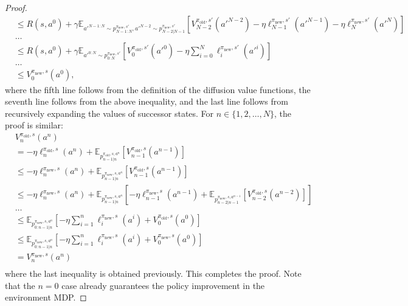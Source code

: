 \begin{proof}
$$\begin{aligned}
        &\leq R(s, a^0)+\gamma\mathbb{E}_{a'^{N-1:N}\sim p^{\pi_{\textrm{new}},s'}_{N-1:N},a'^{N-2}\sim p^{\pi_{\textrm{new}},s'}_{N-2|N-1}}\left[V^{\pi_{\textrm{old}},s'}_{N-2}(a'^{N-2})-\eta\ell_{N-1}^{\pi_{\textrm{new}},s'}(a'^{N-1})-\eta\ell_N^{\pi_{\textrm{new}},s'}(a'^{N})\right]\\
        &\ldots\\
        &\leq R(s, a^0)+\gamma\mathbb{E}_{a'^{0:N}\sim p^{\pi_{\textrm{new}},s'}_{0:N}}\left[V^{\pi_{\textrm{old}},s'}_{0}(a'^{0})-\eta\sum_{i=0}^N\ell_i^{\pi_{\textrm{new}},s'}(a'^{i})\right]\\
        &\ldots\\
        &\leq V_0^{\pi_{\textrm{new}}, s}(a^0),
    \end{aligned}
    $$
    where the fifth line follows from the definition of the diffusion value functions, the seventh line follows from the above inequality, and the last line follows from recursively expanding the values of successor states. For $n\in\{1, 2, \ldots, N\}$, the proof is similar:
    $$
    \begin{aligned}
        &V^{\pi_{\textrm{old}},s}_{n}(a^{n})\\
        &=-\eta\ell^{\pi_{\textrm{old}},s}_n(a^n) + \mathbb{E}_{p^{\pi_{\textrm{old}},s,a^n}_{n-1|n}}\left[V^{\pi_{\textrm{old}},s}_{n-1}(a^{n-1})\right]\\
        &\leq-\eta\ell^{\pi_{\textrm{new}},s}_n(a^n) + \mathbb{E}_{p^{\pi_{\textrm{new}},s,a^n}_{n-1|n}}\left[V^{\pi_{\textrm{old}},s}_{n-1}(a^{n-1})\right]\\
        &\leq-\eta\ell^{\pi_{\textrm{new}},s}_n(a^n) + \mathbb{E}_{p^{\pi_{\textrm{new}},s,a^n}_{n-1|n}}\left[-\eta\ell^{\pi_{\textrm{new}},s}_{n-1}(a^{n-1}) + \mathbb{E}_{p^{\pi_{\textrm{new}},s,a^{n-1}}_{n-2|n-1}}\left[V^{\pi_{\textrm{old}},s}_{n-2}(a^{n-2})\right]\right]\\
        &\ldots\\
        &\leq \mathbb{E}_{p^{\pi_{\textrm{new}},s,a^n}_{0:n-1|n}}\left[-\eta\sum_{i=1}^{n}\ell^{\pi_{\textrm{new}},s}_{i}(a^{i}) + V^{\pi_{\textrm{old}}, s}_0(a^0)\right]\\
        &\leq \mathbb{E}_{p^{\pi_{\textrm{new}},s,a^n}_{0:n-1|n}}\left[-\eta\sum_{i=1}^{n}\ell^{\pi_{\textrm{new}},s}_{i}(a^{i}) + V^{\pi_{\textrm{new}}, s}_0(a^0)\right]\\
        &=V_n^{\pi_{\textrm{new}}, s}(a^n)\\
    \end{aligned}
    $$
    where the last inequality is obtained previously. This completes the proof. Note that the $n=0$ case already guarantees the policy improvement in the environment MDP. 
\end{proof}


